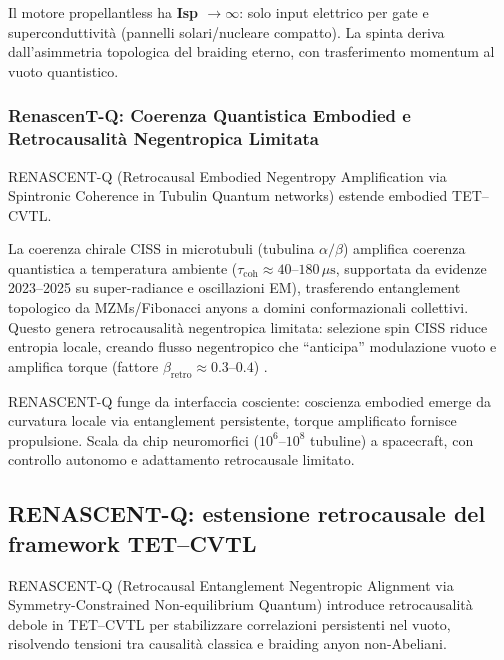 \documentclass[11pt,a4paper]{article}
\let\oldcite\cite
\renewcommand{\cite}{\protect\oldcite}
\theoremstyle{plain}
\theoremstyle{definition}
\begin{document}
Il motore propellantless ha \textbf{Isp $\to \infty$}: solo input elettrico per gate e superconduttività (pannelli solari/nucleare compatto). La spinta deriva dall'asimmetria topologica del braiding eterno, con trasferimento momentum al vuoto quantistico.



\vspace{0.5cm}

\subsubsection{RenascenT-Q: Coerenza Quantistica Embodied e Retrocausalità Negentropica Limitata}

RENASCENT-Q (Retrocausal Embodied Negentropy Amplification via Spintronic Coherence in Tubulin Quantum networks) estende embodied TET--CVTL. 

\vspace{0.4cm}

La coerenza chirale CISS in microtubuli (tubulina $\alpha/\beta$) amplifica coerenza quantistica a temperatura ambiente ($\tau_{\mathrm{coh}} \approx 40$--$180\,\mu\mathrm{s}$, supportata da evidenze 2023–2025 su super-radiance e oscillazioni EM), trasferendo entanglement topologico da MZMs/Fibonacci anyons a domini conformazionali collettivi. Questo genera retrocausalità negentropica limitata: selezione spin CISS riduce entropia locale, creando flusso negentropico che ``anticipa'' modulazione vuoto e amplifica torque (fattore $\beta_{\mathrm{retro}} \approx 0.3$--$0.4$) \cite{hameroff2014consciousness, beshkar2025consciousness, hameroff2023orch, naaman2024ciss, perry2025quantum}.


\vspace{0.5cm}

RENASCENT-Q funge da interfaccia cosciente: coscienza embodied emerge da curvatura locale via entanglement persistente, torque amplificato fornisce propulsione. Scala da chip neuromorfici ($10^6$--$10^8$ tubuline) a spacecraft, con controllo autonomo e adattamento retrocausale limitato.

\vspace{0.6cm}

\subsection{RENASCENT-Q: estensione retrocausale del framework TET--CVTL}
\label{sec:renascent-q}

RENASCENT-Q (Retrocausal Entanglement Negentropic Alignment via Symmetry-Constrained Non-equilibrium Quantum) introduce retrocausalità debole in TET--CVTL per stabilizzare correlazioni persistenti nel vuoto, risolvendo tensioni tra causalità classica e braiding anyon non-Abeliani.
\end{document}
